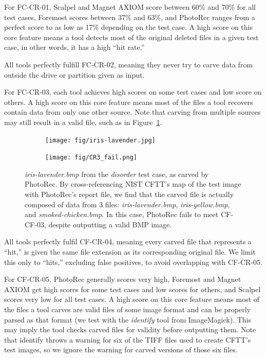 

For FC-CR-01, Scalpel and Magnet AXIOM score between 60\% and 70\% for all test cases, Foremost scores between 37\% and 63\%, and PhotoRec ranges from a perfect score to as low as 17\% depending on the test case.
A high score on this core feature means a tool detects most of the original deleted files in a given test case, in other words, it has a high ``hit rate.''

All tools perfectly fulfill FC-CR-02, meaning they never try to carve data from outside the drive or partition given as input.

For FC-CR-03, each tool achieves high scores on some test cases and low score on others.
A high score on this core feature means most of the files a tool recovers contain data from only one other source.
Note that carving from multiple sources may still result in a valid file, such as in Figure~\ref{fig:CR3_fail}.

\begin{figure}
    \centering
    \begin{subfigure}{0.45\linewidth}
        \texttt{[image: fig/iris-lavender.jpg]}
    \end{subfigure}
    \begin{subfigure}{0.45\linewidth}
        \texttt{[image: fig/CR3\_fail.png]}
    \end{subfigure}
    \caption{
        \emph{iris-lavender.bmp} from the \emph{disorder} test case, as carved by PhotoRec.
        By cross-referencing NIST CFTT's map of the test image with PhotoRec's report file, we find  that the carved file is actually composed of data from 3 files: \emph{iris-lavender.bmp}, \emph{iris-yellow.bmp}, and \emph{smoked-chicken.bmp}.
        In this case, PhotoRec fails to meet CF-CF-03, despite outputting a valid BMP image.
        }
    \label{fig:CR3_fail}
\end{figure}

All tools perfectly fulfil CF-CR-04, meaning every carved file that represents a ``hit,'' is given the same file extension as its corresponding original file.
We limit this only to ``hits,'' excluding false positives, to avoid overlapping with CF-CR-05.

For CF-CR-05, PhotoRec generally scores very high, Foremost and Magnet AXIOM get high scores for some test cases and low scores for others, and Scalpel scores very low for all test cases.
A high score on this core feature means most of the files a tool carves are valid files of some image format and can be properly parsed as that format (we test with the \emph{identify} tool from ImageMagick).
This may imply the tool checks carved files for validity before outputting them.
Note that identify throws a warning for six of the TIFF files used to create CFTT's test images, so we ignore the warning for carved versions of those six files.
